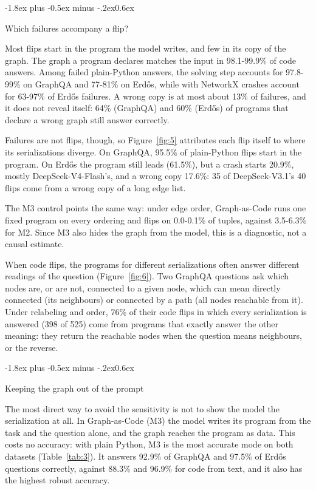 \documentclass[11pt]{article}
\makeatletter
\renewcommand\subsection{\@startsection{subsection}{2}{\z@}
  {-1.8ex plus -0.5ex minus -.2ex}{0.6ex}
  {\normalsize\bfseries\raggedright}}
\makeatother
\begin{document}
\subsection{Which failures accompany a flip?}\label{sec:localize}

Most flips start in the program the model writes, and few in its copy of the graph. The graph a program declares matches the input in 98.1-99.9\% of code answers. Among failed plain-Python answers, the solving step accounts for 97.8-99\% on GraphQA and 77-81\% on Erdős, while with NetworkX crashes account for 63-97\% of Erdős failures. A wrong copy is at most about 13\% of failures, and it does not reveal itself: 64\% (GraphQA) and 60\% (Erdős) of programs that declare a wrong graph still answer correctly.

Failures are not flips, though, so Figure~\ref{fig:5} attributes each flip itself to where its serializations diverge. On GraphQA, 95.5\% of plain-Python flips start in the program. On Erdős the program still leads (61.5\%), but a crash starts 20.9\%, mostly DeepSeek-V4-Flash's, and a wrong copy 17.6\%: 35 of DeepSeek-V3.1's 40 flips come from a wrong copy of a long edge list.

The M3 control points the same way: under edge order, Graph-as-Code runs one fixed program on every ordering and flips on 0.0-0.1\% of tuples, against 3.5-6.3\% for M2. Since M3 also hides the graph from the model, this is a diagnostic, not a causal estimate.

When code flips, the programs for different serializations often answer different readings of the question (Figure~\ref{fig:6}). Two GraphQA questions ask which nodes are, or are not, connected to a given node, which can mean directly connected (its neighbours) or connected by a path (all nodes reachable from it). Under relabeling and order, 76\% of their code flips in which every serialization is answered (398 of 525) come from programs that exactly answer the other meaning: they return the reachable nodes when the question means neighbours, or the reverse.

\subsection{Keeping the graph out of the prompt}\label{sec:m3}

The most direct way to avoid the sensitivity is not to show the model the serialization at all. In Graph-as-Code (M3) the model writes its program from the task and the question alone, and the graph reaches the program as data. This costs no accuracy: with plain Python, M3 is the most accurate mode on both datasets (Table~\ref{tab:3}). It answers 92.9\% of GraphQA and 97.5\% of Erdős questions correctly, against 88.3\% and 96.9\% for code from text, and it also has the highest robust accuracy.
\end{document}
